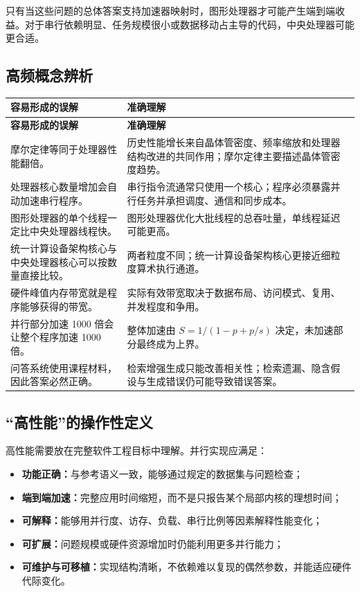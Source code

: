 只有当这些问题的总体答案支持加速器映射时，图形处理器才可能产生端到端收益。对于串行依赖明显、任务规模很小或数据移动占主导的代码，中央处理器可能更合适。

\subsection{高频概念辨析}

\begingroup
\small
\begin{longtable}{L{0.34\textwidth}L{0.60\textwidth}}
\toprule
\textbf{容易形成的误解} & \textbf{准确理解} \\
\midrule
\endfirsthead
\toprule
\textbf{容易形成的误解} & \textbf{准确理解} \\
\midrule
\endhead
摩尔定律等同于处理器性能翻倍。 & 历史性能增长来自晶体管密度、频率缩放和处理器结构改进的共同作用；摩尔定律主要描述晶体管密度趋势。 \\
处理器核心数量增加会自动加速串行程序。 & 串行指令流通常只使用一个核心；程序必须暴露并行任务并承担调度、通信和同步成本。 \\
图形处理器的单个线程一定比中央处理器线程快。 & 图形处理器优化大批线程的总吞吐量，单线程延迟可能更高。 \\
统一计算设备架构核心与中央处理器核心可以按数量直接比较。 & 两者粒度不同；统一计算设备架构核心更接近细粒度算术执行通道。 \\
硬件峰值内存带宽就是程序能够获得的带宽。 & 实际有效带宽取决于数据布局、访问模式、复用、并发程度和争用。 \\
并行部分加速 1000 倍会让整个程序加速 1000 倍。 & 整体加速由 $S=1/(1-p+p/s)$ 决定，未加速部分最终成为上界。 \\
问答系统使用课程材料，因此答案必然正确。 & 检索增强生成只能改善相关性；检索遗漏、隐含假设与生成错误仍可能导致错误答案。 \\
\bottomrule
\end{longtable}
\endgroup

\subsection{“高性能”的操作性定义}

高性能需要放在完整软件工程目标中理解。并行实现应满足：
\begin{itemize}[itemsep=0.15em,parsep=0pt,topsep=0.3em]
  \item \textbf{功能正确：}与参考语义一致，能够通过规定的数据集与问题检查；
  \item \textbf{端到端加速：}完整应用时间缩短，而不是只报告某个局部内核的理想时间；
  \item \textbf{可解释：}能够用并行度、访存、负载、串行比例等因素解释性能变化；
  \item \textbf{可扩展：}问题规模或硬件资源增加时仍能利用更多并行能力；
  \item \textbf{可维护与可移植：}实现结构清晰，不依赖难以复现的偶然参数，并能适应硬件代际变化。
\end{itemize}

